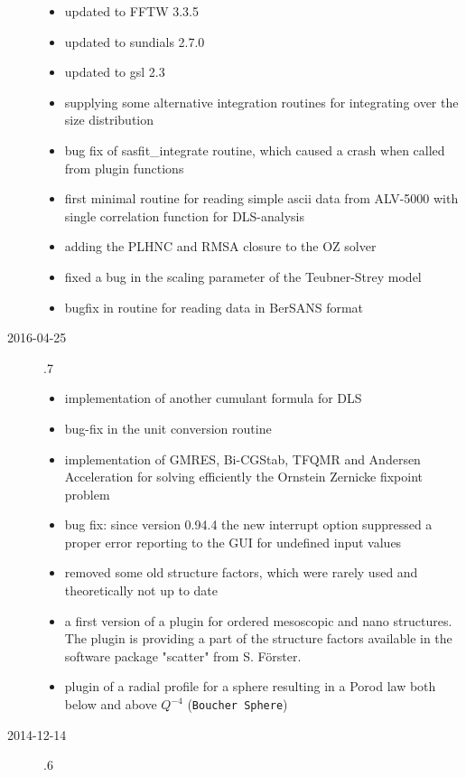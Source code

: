 \begin{description}
\begin{itemize}
        \item updated to FFTW 3.3.5
        \item updated to sundials 2.7.0
        \item updated to gsl 2.3
        \item supplying some alternative integration routines for integrating over the size distribution
        \item bug fix of sasfit\_integrate routine, which caused a crash when called from plugin functions
        \item first minimal routine for reading simple ascii data from ALV-5000 with single correlation function for DLS-analysis
        \item adding the PLHNC and RMSA closure to the OZ solver
        \item fixed a bug in the scaling parameter of the Teubner-Strey model
        \item bugfix in routine for reading data in BerSANS format
    \end{itemize}
\item[2016-04-25] .7
    \begin{itemize}
        \item  implementation of another cumulant formula for DLS
        \item  bug-fix in the unit conversion routine
        \item  implementation of GMRES, Bi-CGStab, TFQMR and Andersen Acceleration
                for solving efficiently the Ornstein Zernicke fixpoint problem
        \item   bug fix: since version 0.94.4 the new interrupt option suppressed
                a proper error reporting to the GUI for undefined input values
        \item   removed some old structure factors,
                which were rarely used and theoretically not up to date
        \item   a first version of a plugin for ordered mesoscopic and nano structures.
                The plugin is providing a part of the structure factors available
                in the software package "scatter" from S. Förster.
        \item   plugin of a radial profile for a sphere resulting in a Porod law both below and above $Q^{-4}$ (\texttt{Boucher Sphere})
    \end{itemize}
\item[2014-12-14] .6
    \begin{itemize}

\end{itemize}
\end{description}
